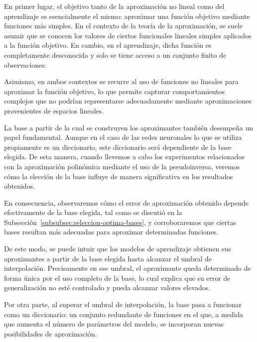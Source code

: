 En primer lugar, el objetivo tanto de la aproximación no lineal como del aprendizaje es esencialmente el mismo: aproximar una función objetivo mediante funciones más simples. En el contexto de la teoría de la aproximación, se suele asumir que se conocen los valores de ciertos funcionales lineales simples aplicados a la función objetivo. En cambio, en el aprendizaje, dicha función es completamente desconocida y solo se tiene acceso a un conjunto finito de observaciones.\newline

Asimismo, en ambos contextos se recurre al uso de funciones no lineales para aproximar la función objetivo, lo que permite capturar comportamientos complejos que no podrían representarse adecuadamente mediante aproximaciones provenientes de espacios lineales.\newline

La base a partir de la cual se construyen los aproximantes también desempeña un papel fundamental. Aunque en el caso de las redes neuronales lo que se utiliza propiamente es un diccionario, este diccionario será dependiente de la base elegida. De esta manera, cuando llevemos a cabo los experimentos relacionados con la aproximación polinómica mediante el uso de la pseudoinversa, veremos cómo la elección de la base influye de manera significativa en los resultados obtenidos.\newline

En consecuencia, observaremos cómo el error de aproximación obtenido depende efectivamente de la base elegida, tal como se discutió en la Subsección~\ref{subsubsec:seleccion-optima-bases}, y corroboraremos que ciertas bases resultan más adecuadas para aproximar determinadas funciones.\newline

De este modo, se puede intuir que los modelos de aprendizaje obtienen sus aproximantes a partir de la base elegida hasta alcanzar el umbral de interpolación. Precisamente en ese umbral, el aproximante queda determinado de forma única por el uso completo de la base, lo cual explica que su error de generalización no esté controlado y pueda alcanzar valores elevados.\newline

Por otra parte, al superar el umbral de interpolación, la base pasa a funcionar como un diccionario: un conjunto redundante de funciones en el que, a medida que aumenta el número de parámetros del modelo, se incorporan nuevas posibilidades de aproximación.\newline


